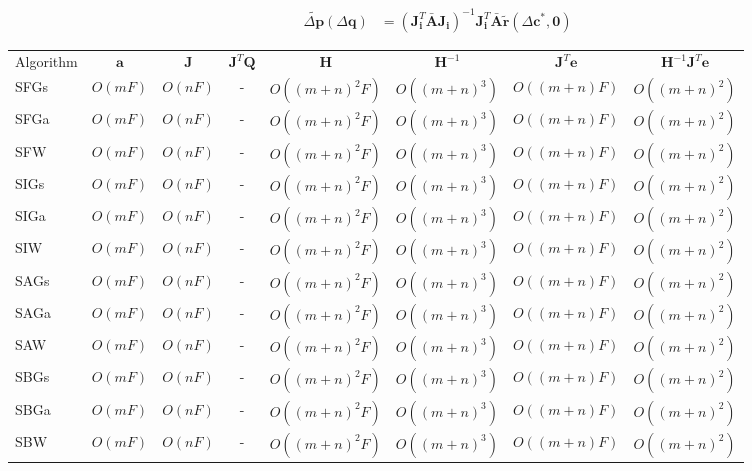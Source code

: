 \begin{equation}
    \begin{aligned}
        \tilde{\Delta \mathbf{p}}(\Delta \mathbf{q}) & = \left( \mathbf{J}_{\mathbf{i}}^T \bar{\mathbf{A}} \mathbf{J}_{\mathbf{i}} \right)^{-1} \mathbf{J}_{\mathbf{i}}^T \bar{\mathbf{A}} \tilde{\mathbf{r}}(\Delta\mathbf{c}^*, \mathbf{0})
    \label{eq:wiberg_appearance}
    \end{aligned}
\end{equation}



\begin{table*}
\begin{tabular}{lccccccc}
\hline\noalign{\smallskip}
Algorithm & $\mathbf{a}$ & $\mathbf{J}$ & $\mathbf{J}^T\mathbf{Q}$ & $\mathbf{H}$ & $\mathbf{H}^{-1}$ & $\mathbf{J}^T\mathbf{e}$ & $\mathbf{H}^{-1}\mathbf{J}^T\mathbf{e}$ \\
\noalign{\smallskip}\hline\noalign{\smallskip}

SFGs & $O(mF)$ & $O(nF)$ & - & $O((m+n)^2F)$ & $O((m+n)^3)$ & $O((m+n)F)$ & $O((m+n)^2)$ \\
SFGa & $O(mF)$ & $O(nF)$ & - & $O((m+n)^2F)$ & $O((m+n)^3)$ & $O((m+n)F)$ & $O((m+n)^2)$ \\
SFW & $O(mF)$ & $O(nF)$ & - & $O((m+n)^2F)$ & $O((m+n)^3)$ & $O((m+n)F)$ & $O((m+n)^2)$ \\

SIGs & $O(mF)$ & $O(nF)$ & - & $O((m+n)^2F)$ & $O((m+n)^3)$ & $O((m+n)F)$ & $O((m+n)^2)$ \\
SIGa & $O(mF)$ & $O(nF)$ & - & $O((m+n)^2F)$ & $O((m+n)^3)$ & $O((m+n)F)$ & $O((m+n)^2)$ \\
SIW & $O(mF)$ & $O(nF)$ & - & $O((m+n)^2F)$ & $O((m+n)^3)$ & $O((m+n)F)$ & $O((m+n)^2)$ \\

SAGs & $O(mF)$ & $O(nF)$ & - & $O((m+n)^2F)$ & $O((m+n)^3)$ & $O((m+n)F)$ & $O((m+n)^2)$ \\
SAGa & $O(mF)$ & $O(nF)$ & - & $O((m+n)^2F)$ & $O((m+n)^3)$ & $O((m+n)F)$ & $O((m+n)^2)$ \\
SAW & $O(mF)$ & $O(nF)$ & - & $O((m+n)^2F)$ & $O((m+n)^3)$ & $O((m+n)F)$ & $O((m+n)^2)$ \\

SBGs & $O(mF)$ & $O(nF)$ & - & $O((m+n)^2F)$ & $O((m+n)^3)$ & $O((m+n)F)$ & $O((m+n)^2)$ \\
SBGa & $O(mF)$ & $O(nF)$ & - & $O((m+n)^2F)$ & $O((m+n)^3)$ & $O((m+n)F)$ & $O((m+n)^2)$ \\
SBW & $O(mF)$ & $O(nF)$ & - & $O((m+n)^2F)$ & $O((m+n)^3)$ & $O((m+n)F)$ & $O((m+n)^2)$ \\


\end{tabular}
\end{table*}
